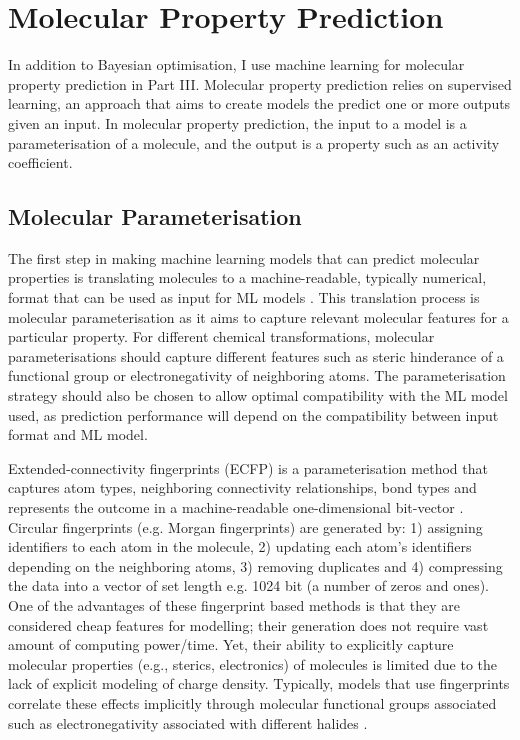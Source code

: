 \section{Molecular Property Prediction}

In addition to Bayesian optimisation, I use machine learning for molecular property prediction in Part III. Molecular property prediction relies on supervised learning, an approach that aims to create models the predict one or more outputs given an input. In molecular property prediction, the input to a model is a parameterisation of a molecule, and the output is a property such as an activity coefficient.

\subsection{Molecular Parameterisation}

The first step in making machine learning models that can predict molecular properties is translating molecules to a machine-readable, typically numerical, format that can be used as input for ML models \cite{Wigh2022}. This translation process is molecular parameterisation as it aims to capture relevant molecular features for a particular property. For different chemical transformations, molecular parameterisations should capture different features such as steric hinderance of a functional group or electronegativity of neighboring atoms. The parameterisation strategy should also be chosen to allow optimal compatibility with the ML model used, as prediction performance will depend on the compatibility between input format and ML model.

Extended-connectivity fingerprints (ECFP) is a parameterisation method that captures atom types, neighboring connectivity relationships, bond types and represents the outcome in a machine-readable one-dimensional bit-vector \cite{Rogers2010}. Circular fingerprints (e.g. Morgan fingerprints) are generated by: 1) assigning identifiers to each atom in the molecule, 2) updating each atom’s identifiers depending on the neighboring atoms, 3) removing duplicates and 4) compressing the data into a vector of set length e.g. 1024 bit (a number of zeros and ones). One of the advantages of these fingerprint based methods is that they are considered cheap features for modelling; their generation does not require vast amount of computing power/time. Yet, their ability to explicitly capture molecular properties (e.g., sterics, electronics) of molecules is limited due to the lack of explicit modeling of charge density. Typically, models that use fingerprints correlate these effects implicitly through molecular functional groups associated such as electronegativity associated with different halides \cite{Eyke2020}.

